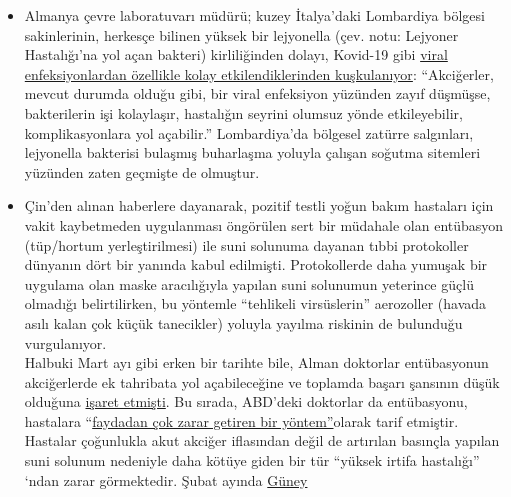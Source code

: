 \begin{itemize}
{  fazladan ölüm} oldu. Normalde, İsviçre'de her yıl \%95'i 65 yaşının
  üzerinde olan yaklaşık
  \href{https://www.nzz.ch/lungenentzuendung-1.4550285}{1300 kişi}
  zatürreden ölmektedir. Bununla kıyaslandığında, şu anda İsviçre'de
  Kovid-19'lu (Kovid-19'un neden olduğu değil) toplam
  \href{https://www.corona-data.ch/}{762 ölüm} olduğu bildirilmiştir.
\item
  Almanya çevre laboratuvarı müdürü; kuzey İtalya'daki Lombardiya
  bölgesi sakinlerinin, herkesçe bilinen yüksek bir lejyonella (çev.
  notu: Lejyoner Hastalığı'na yol açan bakteri) kirliliğinden dolayı,
  Kovid-19 gibi
  \href{https://m.apotheke-adhoc.de/nachrichten/detail/coronavirus/erhoehen-legionellen-die-todesrate-einer-corona-infektion/}{viral
  enfeksiyonlardan özellikle kolay etkilendiklerinden kuşkulanıyor}:
  ``Akciğerler, mevcut durumda olduğu gibi, bir viral enfeksiyon
  yüzünden zayıf düşmüşse, bakterilerin işi kolaylaşır, hastalığın
  seyrini olumsuz yönde etkileyebilir, komplikasyonlara yol açabilir.''
  Lombardiya'da bölgesel zatürre salgınları, lejyonella bakterisi
  bulaşmış buharlaşma yoluyla çalışan soğutma sitemleri yüzünden zaten
  geçmişte de olmuştur.
\item
  Çin'den alınan haberlere dayanarak, pozitif testli yoğun bakım
  hastaları için vakit kaybetmeden uygulanması öngörülen sert bir
  müdahale olan entübasyon (tüp/hortum yerleştirilmesi) ile suni
  solunuma dayanan tıbbi protokoller dünyanın dört bir yanında kabul
  edilmişti. Protokollerde daha yumuşak bir uygulama olan maske
  aracılığıyla yapılan suni solunumun yeterince güçlü olmadığı
  belirtilirken, bu yöntemle ``tehlikeli virsüslerin'' aerozoller
  (havada asılı kalan çok küçük tanecikler) yoluyla yayılma riskinin de
  bulunduğu vurgulanıyor.\\
  Halbuki Mart ayı gibi erken bir tarihte bile, Alman doktorlar
  entübasyonun akciğerlerde ek tahribata yol açabileceğine ve toplamda
  başarı şansının düşük olduğuna
  \href{https://www.doccheck.com/de/detail/articles/26271-covid-19-beatmung-und-dann}{işaret
  etmişti}. Bu sırada, ABD'deki doktorlar da entübasyonu, hastalara
  ``\href{https://www.youtube.com/watch?v=k9GYTc53r2o}{faydadan çok
  zarar getiren bir yöntem''}olarak tarif etmiştir. Hastalar çoğunlukla
  akut akciğer iflasından değil de artırılan basınçla yapılan suni
  solunum nedeniyle daha kötüye giden bir tür ``yüksek irtifa
  hastalığı'' `ndan zarar görmektedir. Şubat ayında
  \href{https://www.upi.com/Top_News/World-News/2020/02/14/Oxygen-therapy-working-for-coronavirus-patient-Seoul-says/6651581696794/}{Güney
}
\end{itemize}
